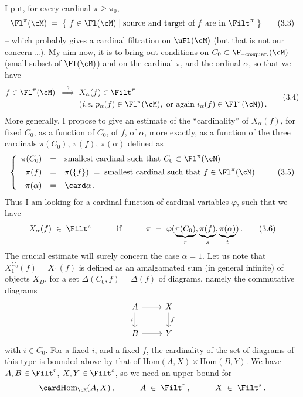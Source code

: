 I put, for every cardinal $\pi\geq\pi_0$,
\[
\Fl^\pi(\cM) \;=\; \{\ f\in\Fl(\cM) \mid \text{source and target of $f$ are in } \Filt^\pi\ \}
\tag*{(3.3)}
\]
-- which probably gives a cardinal filtration on $\uFl(\cM)$ (but that is not our concern \ldots). My aim now, it is to bring out conditions on $C_0\subset\Fl_{\text{cosquar.}}(\cM)$ (small subset of $\Fl(\cM)$) and on the cardinal $\pi$, and the ordinal $\alpha$, so that we have
\[
\begin{aligned}
f\in\Fl^\pi(\cM) \;\;\overset{?}{\Longrightarrow}\;\; & X_\alpha(f)\in\Filt^\pi \\
& (\textit{i.e.}\ p_\alpha(f)\in\Fl^\pi(\cM),\ \text{or again } i_\alpha(f)\in\Fl^\pi(\cM))\,.
\end{aligned}
\tag*{(3.4)}
\]
More generally, I propose to give an estimate of the ``cardinality'' of $X_\alpha(f)$, for fixed $C_0$, as a function of $C_0$, of $f$, of $\alpha$, more exactly, as a function of the three cardinals $\pi(C_0)$, $\pi(f)$, $\pi(\alpha)$ defined as
\[
\left\{
\begin{array}{rcl}
\pi(C_0) & = & \text{smallest cardinal such that } C_0\subset\Fl^\pi(\cM) \\[1ex]
\pi(f) & = & \pi(\{f\}) \;=\; \text{smallest cardinal such that } f\in\Fl^\pi(\cM) \\[1ex]
\pi(\alpha) & = & \card\alpha\,.
\end{array}
\right.
\tag*{(3.5)}
\]
Thus I am looking for a cardinal
function of cardinal variables $\varphi$, such that we have
\[
X_\alpha(f) \;\in\; \Filt^\pi \qquad\quad \text{if} \qquad\quad \pi \;=\; \varphi(\underbrace{\pi(C_0)}_{r},\underbrace{\pi(f)}_{s},\underbrace{\pi(\alpha)}_{t})\,.
\tag*{(3.6)}
\]
The crucial estimate will surely concern the case $\alpha=1$. Let us note that $X_1^{C_0}(f)=X_1(f)$ is defined as an amalgamated sum (in general infinite) of objects $X_D$, for a set $\Delta(C_0,f)=\Delta(f)$ of diagrams, namely the commutative diagrams
\[
\begin{tikzcd}
A \arrow[r] \arrow[d, "i"'] & X \arrow[d, "f"] \\
B \arrow[r] & Y
\end{tikzcd}
\]
with $i\in C_0$. For a fixed $i$, and a fixed $f$, the cardinality of the set of diagrams of this type is bounded above by that of $\mathrm{Hom}(A,X)\times\mathrm{Hom}(B,Y)$. We have $A,B\in\Filt^r$, $X,Y\in\Filt^s$, so we need an upper bound for
\[
\card\mathrm{Hom}_{\cM}(A,X)\,, \qquad\quad A\;\in\;\Filt^r\,, \qquad\quad X\;\in\;\Filt^s\,.
\]


